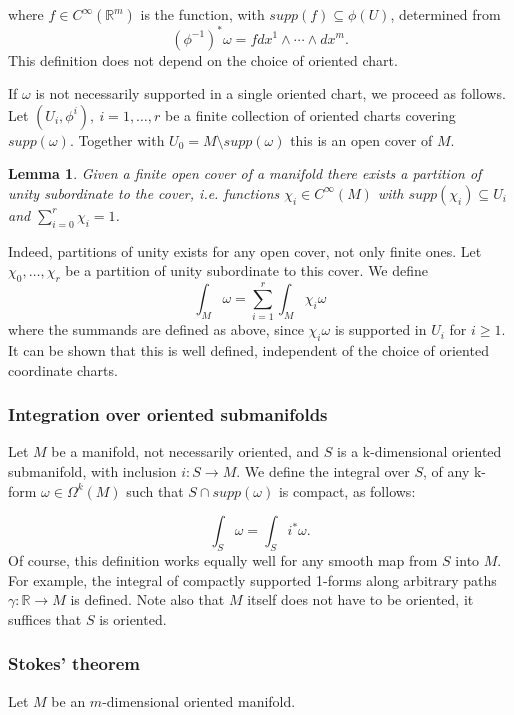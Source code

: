 \documentclass{article}
\newtheorem{lemma}[theorem]{Lemma}
\theoremstyle{definition}
\begin{document}
where $f \in C^\infty(\mathbb R^m)$ is the function, with $supp(f) \subseteq \phi(U)$, determined from 
\[
(\phi^{-1} )^* \omega = f dx^1 \wedge \cdots \wedge dx^m.
\]
This definition does not depend on the choice of oriented chart.

If $\omega$ is not necessarily supported in a single oriented chart, we proceed as follows. Let  $ (U_i , \phi^i), \ i = 1,\dots,r$ be a finite collection of oriented charts covering $supp(\omega)$. Together with $U_0 = M \setminus supp(\omega)$ this is an open cover of $M$.

\begin{lemma}
Given a finite open cover of a manifold there exists a partition of unity subordinate to the cover, i.e. functions $\chi_i \in C^\infty(M)$ with $supp(\chi_i) \subseteq U_i$ and $\sum_{i=0}^r \chi_i = 1$.

\end{lemma}

Indeed, partitions of unity exists for any open cover, not only finite ones. Let $\chi_0, \dots, \chi_r$ be a partition of unity subordinate to this cover. We define
\[
    \int_M \omega = \sum_{i=1}^r \int_M \chi_i \omega
\] 
where the summands are defined as above, since $\chi_i\omega$ is supported in $U_i$ for $i \geq 1$. It can be shown that this is well defined, independent of the choice of oriented coordinate charts.

\subsubsection{Integration over oriented submanifolds}

Let $M$ be a manifold, not necessarily oriented, and $S$ is a k-dimensional oriented submanifold, with inclusion $i : S \rightarrow M$. We define the integral over $S$, of any k-form $\omega \in \Omega^k (M)$ such that $S \cap supp(\omega)$ is compact, as follows:

\[
    \int_S \omega = \int_S i^* \omega.
\]
Of course, this definition works equally well for any smooth map from $S$ into $M$. For example, the integral of compactly supported 1-forms along arbitrary paths $\gamma : \mathbb R \rightarrow M$ is defined. Note also that $M$ itself does not have to be oriented, it suffices that $S$ is oriented.

\subsubsection{Stokes’ theorem}
Let $M$ be an $m$-dimensional oriented manifold.
\end{document}
